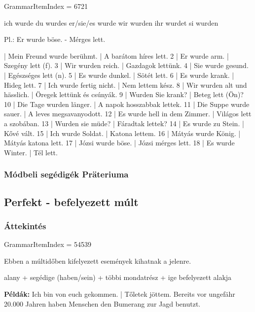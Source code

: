 \documentclass{article}
\newenvironment{desc}{\verbatim}{\endverbatim}
\newenvironment{exmp}{\verbatim}{\endverbatim}
\begin{document}
GrammarItemIndex = 6721

\begin{desc}
ich wurde
du wurdes
er/sie/es wurde
wir wurden
ihr wurdet
si wurden

Pl.: Er wurde böse. - Mérges lett.
\end{desc}

\begin{exmp}
1 | Mein Freund wurde berühmt. | A barátom híres lett.
2 | Er wurde arm. | Szegény lett (f).
3 | Wir wurden reich. | Gazdagok lettünk.
4 | Sie wurde gesund. | Egészséges lett (n).
5 | Es wurde dunkel. | Sötét lett.
6 | Es wurde krank. | Hideg lett.
7 | Ich wurde fertig nicht. | Nem lettem kész.
8 | Wir wurden alt und hässlich. | Öregek lettünk és csúnyák.
9 | Wurden Sie krank? | Beteg lett (Ön)?
10 | Die Tage wurden länger. | A napok hosszabbak lettek.
11 | Die Suppe wurde sauer. | A leves megsavanyodott.
12 | Es wurde hell in dem Zimmer. | Világos lett a szobában.
13 | Wurden sie müde? | Fáradtak lettek?
14 | Es wurde zu Stein. | Kővé vált.
15 | Ich wurde Soldat. | Katona lettem.
16 | Mátyás wurde König. | Mátyás katona lett.
17 | Józsi wurde böse. | Józsi mérges lett.
18 | Es wurde Winter. | Tél lett.
\end{exmp}

\subsubsection{Módbeli segédigék Präteriuma}

\subsection{Perfekt - befelyezett múlt}

\subsubsection{Áttekintés}

GrammarItemIndex = 54539

\begin{desc}
Ebben a múltidőben kifelyezett események kihatnak a jelenre.
\begin{center}
alany + segédige (haben/sein) + többi mondatrész + ige befelyezett alakja
\end{center}

\textbf{Példák:} Ich bin von euch gekommen. | Tőletek jöttem.
Bereits vor ungefähr 20.000 Jahren haben Menschen den Bumerang zur Jagd benutzt.
\end{desc}
\end{document}
